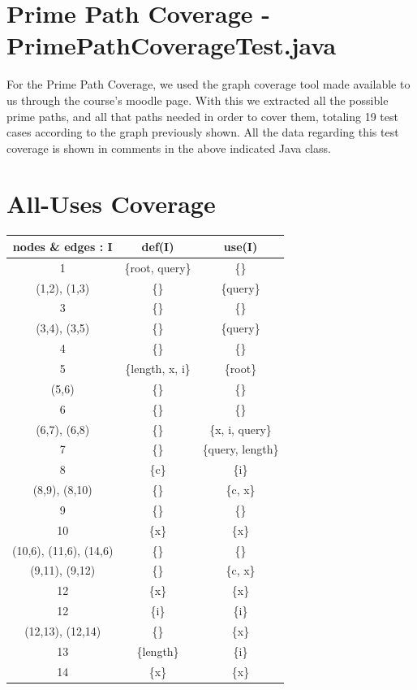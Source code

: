 \documentclass[12pt]{article}
\begin{document}
\section[Prime Path Coverage - PrimePathCoverageTest.java]{Prime Path Coverage - \\PrimePathCoverageTest.java}
For the Prime Path Coverage, we used the graph coverage tool made available to us through the course's moodle page. With this we extracted all the possible prime paths, and all that paths needed in order to cover them, totaling 19 test cases according to the graph previously shown. All the data regarding this test coverage is shown in comments in the above indicated Java class.

\section{All-Uses Coverage }

\begin{table}[htb]
\centering
\begin{tabular}{| c | c | c |} 
 \hline
 \textbf{nodes \& edges : I} & \textbf{def(I}) & \textbf{use(I)} \\ \hline
 1                      & \{root, query\} & \{\} \\ \hline
 (1,2), (1,3)           & \{\} & \{query\} \\ \hline
 3                      & \{\} & \{\} \\ \hline
 (3,4), (3,5)           & \{\} & \{query\} \\ \hline
 4                      & \{\} & \{\} \\ \hline
 5                      & \{length, x, i\} & \{root\} \\ \hline
 (5,6)                  & \{\} & \{\} \\ \hline
 6                      & \{\} & \{\} \\ \hline
 (6,7), (6,8)           & \{\} & \{x, i, query\} \\ \hline
 7                      & \{\} & \{query, length\} \\ \hline
 8                      & \{c\} & \{i\} \\ \hline
 (8,9), (8,10)          & \{\} & \{c, x\} \\ \hline
 9                      & \{\} & \{\} \\ \hline
 10                     & \{x\} & \{x\} \\ \hline
 (10,6), (11,6), (14,6) & \{\} & \{\} \\ \hline
 (9,11), (9,12)         & \{\} & \{c, x\} \\ \hline
 12                     & \{x\} & \{x\} \\ \hline
 12                     & \{i\} & \{i\} \\ \hline
 (12,13), (12,14)       & \{\} & \{x\} \\ \hline
 13                     & \{length\} & \{i\} \\ \hline
 14                     & \{x\} & \{x\} \\ \hline
\end{tabular}
\end{table}
\end{document}
